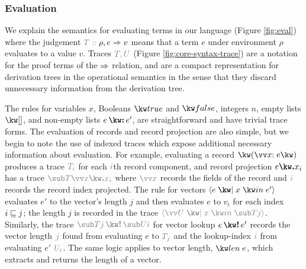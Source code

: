 \subsubsection{Evaluation}
\label{sec:core-language:eval}






We explain the semantics for evaluating terms in our language (Figure \ref{fig:eval}) where the judgement $\explVal{T}{\rho, e \evalR v}$ means that a term $e$ under environment $\rho$ evaluates to a value $v$. Traces $\textcolor{gray}{T, U}$ (Figure \ref{fig:core-syntax-trace}) are a notation for the proof terms of the $\Rightarrow$ relation, and are a compact representation for derivation trees in the operational semantics in the sense that they discard unnecessary information from the derivation tree.

The rules for variables $x$, Booleans $\exTrue$ and $\exFalse$, integers $n$, empty lists $\exNil$, and non-empty lists $\exCons{e}{e'}$, are straightforward and have trivial trace forms. The evaluation of records and record projection are also simple, but we begin to note the use of indexed traces which expose additional necessary information about evaluation. For example, evaluating a record $\exRec{\vec{\bind{x}{e}}}$ produces a trace $\textcolor{gray}{T_i}$ for each $\textcolor{gray}{i}$th record component, and record projection $\exRecProj{e}{x_i}$ has a trace $\textcolor{gray}{\trRecProj{T}{\vec{x}}{x_i}}$ where $\textcolor{gray}{\vec{x}}$ records the fields of the record and $\textcolor{gray}{i}$ records the record index projected. The rule for vectors $\exVec{e}{x}{e'}$ evaluates $e'$ to the vector's length $j$ and then evaluates $e$ to $v_i$ for each index $i \numleq j$; the length $j$ is recorded in the trace $\textcolor{gray}{\trVec{\vec{U}}{x}{T}{j}}$. Similarly, the trace $\textcolor{gray}{\trVecLookup{T}{j}{U}{i}}$ for vector lookup $\exVecLookup{e}{e'}$ records the vector length $\textcolor{gray}{j}$ found from evaluating $e$ to $\textcolor{gray}{T_j}$ and the lookup-index $\textcolor{gray}{i}$ from evaluating $e'$ $\textcolor{gray}{U_i}$. The same logic applies to vector length, $\exVecLen{e}$, which extracts and returns the length of a vector.

